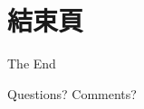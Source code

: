 \documentclass[12pt, aspectratio=169]{beamer}
\begin{document}

\section*{結束頁}


\begin{frame}[plain] %

	\begin{center}
		{\Huge The End}
		
		\bigskip\bigskip 
		
		{\LARGE Questions? Comments?}
	\end{center}
	
\end{frame}

\end{document}
